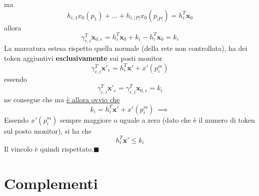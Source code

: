 \documentclass[10pt, letterpaper]{report}
\begin{document}
ma $$ h_{i,1}x_0(p_1)+ \dots + h_{i,|P|}x_0(p_{|P|})=h_i^T\mathbf x_0$$
allora 
$$ \gamma_{e,i}^T\mathbf x_{0,e}=h_i^T\mathbf x_0+k_i-h_i^T\mathbf x_0=k_i$$
La marcatura estesa rispetto quella normale (della rete non controllata), ha dei token aggiuntivi \textbf{esclusivamente} sui posti monitor 
$$\gamma_{e,i}^T \mathbf x'_e=
h_i^T \mathbf x'+ x'(p_i^m)$$
essendo 
$$\gamma_{e,i}^T\mathbf x'_e=\gamma_{e,i}^T\mathbf x_{0,e}=k_i$$ ne consegue che 
ma \underline{è allora ovvio che }
$$k_i=
h_i^T \mathbf x'+ x'(p_i^m) \ \implies $$
Essendo $x'(p_i^m)$ sempre maggiore o uguale a zero (dato che è il numero di token sul posto monitor), si ha che 
$$ h_i^T \mathbf x'\le k_i$$
Il vincolo è quindi rispettato.\hfill$\blacksquare$\acc 







\chapter{Complementi}
\end{document}
